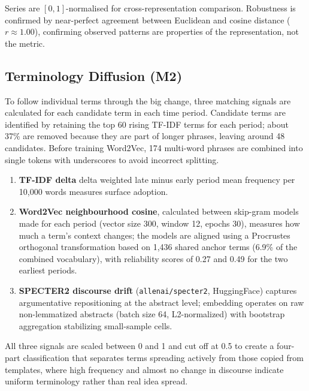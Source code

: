 Series are $[0,1]$-normalised for cross-representation comparison. Robustness is confirmed by near-perfect agreement between Euclidean and cosine distance ($r \approx 1.00$), confirming observed patterns are properties of the representation, not the metric.

\subsection{Terminology Diffusion (M2)}

To follow individual terms through the big change, three matching signals are calculated for each candidate term in each time period. Candidate terms are identified by retaining the top 60 rising TF-IDF terms for each period; about 37\% are removed because they are part of longer phrases, leaving around 48 candidates. Before training Word2Vec, 174 multi-word phrases are combined into single tokens with underscores to avoid incorrect splitting.

\begin{enumerate}[leftmargin=*, label=(\roman*)]
\item \textbf{TF-IDF delta} delta weighted late minus early period mean frequency per 10,000 words measures surface adoption.
\item \textbf{Word2Vec neighbourhood cosine}, calculated between skip-gram models made for each period (vector size 300, window 12, epochs 30), measures how much a term's context changes; the models are aligned using a Procrustes orthogonal transformation based on 1,436 shared anchor terms (6.9\% of the combined vocabulary), with reliability scores of 0.27 and 0.49 for the two earliest periods.
\item \textbf{SPECTER2 discourse drift} (\texttt{allenai/specter2}, HuggingFace) captures argumentative repositioning at the abstract level; embedding operates on raw non-lemmatized abstracts (batch size 64, L2-normalized) with bootstrap aggregation stabilizing small-sample cells.
\end{enumerate}

All three signals are scaled between 0 and 1 and cut off at 0.5 to create a four-part classification that separates terms spreading actively from those copied from templates, where high frequency and almost no change in discourse indicate uniform terminology rather than real idea spread.
